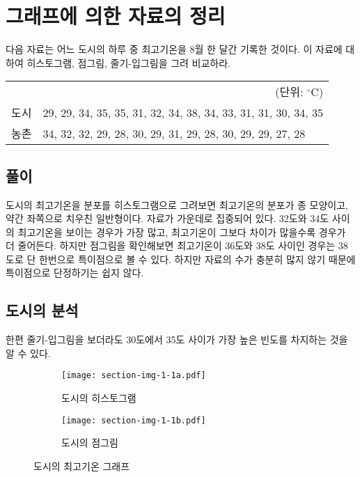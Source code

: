\section{그래프에 의한 자료의 정리}

다음 자료는 어느 도시의 하루 중 최고기온을 8월 한 달간 기록한 것이다.
이 자료에 대하여 히스토그램, 점그림, 줄기-입그림을 그려 비교하라.

\begin{tabularx}{0.9\textwidth}{ l|X }
  \multicolumn{2}{r}{\small(단위: $^{\circ}\mathrm{C}$)} \\
  \noalign{\smallskip}\hline\noalign{\smallskip}
  도시 &
  29, 29, 34, 35, 35, 31, 32, 34, 38, 34, 33, 31, 31, 30, 34, 35 \\
  농촌 &
  34, 32, 32, 29, 28, 30, 29, 31, 29, 28, 30, 29, 29, 27, 28 \\
\end{tabularx}

\subsection{풀이}

도시의 최고기온을 분포를 히스토그램으로 그려보면
최고기온의 분포가 종 모양이고, 약간 좌쪽으로 치우친 일반형이다.
자료가 가운데로 집중되어 있다. 32도와 34도 사이의 최고기온을 보이는 경우가 가장 많고,
최고기온이 그보다 차이가 많을수록 경우가 더 줄어든다. 하지만 점그림을 확인해보면
최고기온이 36도와 38도 사이인 경우는 38도로 단 한번으로 특이점으로 볼 수 있다.
하지만 자료의 수가 충분히 많지 않기 때문에 특이점으로 단정하기는 쉽지 않다.

\subsection{도시의 분석}


한편 줄기-입그림을 보더라도 30도에서 35도 사이가 가장 높은 빈도를 차지하는 것을
알 수 있다.

\begin{figure}[!hb]
  \begin{subfigure}{0.5\textwidth}
    \centering
    \texttt{[image: section-img-1-1a.pdf]}
    \caption{도시의 히스토그램}
  \end{subfigure}
  \begin{subfigure}{0.5\textwidth}
    \centering
    \texttt{[image: section-img-1-1b.pdf]}
    \caption{도시의 점그림}
  \end{subfigure}
  \caption{도시의 최고기온 그래프}
\end{figure}

